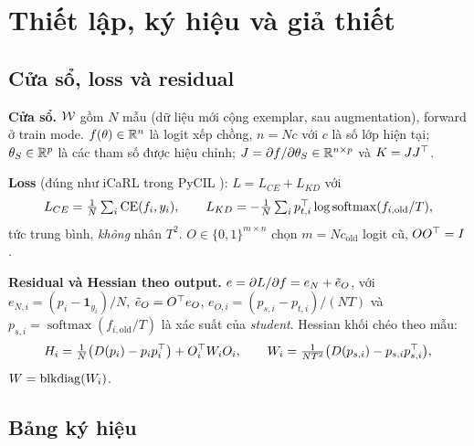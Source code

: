 \section{Thiết lập, ký hiệu và giả thiết}\label{sec:setting}

\subsection{Cửa sổ, loss và residual}

\textbf{Cửa sổ.} $\mathcal{W}$ gồm $N$ mẫu (dữ liệu mới cộng exemplar, sau augmentation), forward ở train mode. $f(\theta)\in\mathbb{R}^n$ là logit xếp chồng, $n=N c$ với $c$ là số lớp hiện tại; $\theta_S\in\mathbb{R}^p$ là các tham số được hiệu chỉnh; $J=\partial f/\partial\theta_S\in\mathbb{R}^{n\times p}$ và $K=JJ^{\top}$.

\textbf{Loss} (đúng như iCaRL trong PyCIL \cite{rebuffi2017icarl,zhou2023pycil}): $L=L_{CE}+L_{KD}$ với
\[
L_{CE}=\tfrac1N\textstyle\sum_i \mathrm{CE}(f_i,y_i),\qquad
L_{KD}=-\tfrac1N\textstyle\sum_i p_{t,i}^{\top}\log\operatorname{softmax}(f_{i,\mathrm{old}}/T),
\]
tức trung bình, \emph{không} nhân $T^2$. $O\in\{0,1\}^{m\times n}$ chọn $m=Nc_{\mathrm{old}}$ logit cũ, $OO^{\top}=I$.

\textbf{Residual và Hessian theo output.} $e=\partial L/\partial f=e_N+\tilde e_O$, với $e_{N,i}=(p_i-\mathbf 1_{y_i})/N$, $\tilde e_O=O^{\top} e_O$, $e_{O,i}=(p_{s,i}-p_{t,i})/(NT)$ và $p_{s,i}=\operatorname{softmax}(f_{i,\mathrm{old}}/T)$ là xác suất của \emph{student}. Hessian khối chéo theo mẫu:
\[
H_i=\tfrac1N\big(D(p_i)-p_ip_i^{\top}\big)+O_i^{\top} W_iO_i,\qquad W_i=\tfrac{1}{NT^2}\big(D(p_{s,i})-p_{s,i}p_{s,i}^{\top}\big),
\]
$W=\operatorname{blkdiag}(W_i)$.

\subsection{Bảng ký hiệu}

